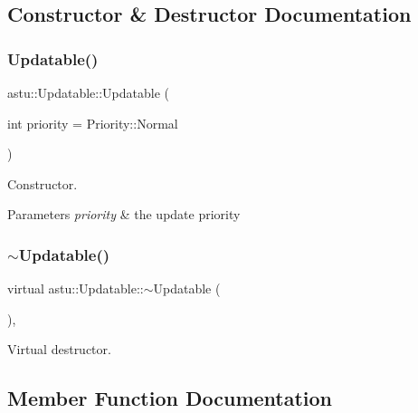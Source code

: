 \subsection{Constructor \& Destructor Documentation}
\mbox{\label{classastu_1_1Updatable_a5004b9bf883f7961762d0edc6b8329ba}} 
\subsubsection{\texorpdfstring{Updatable()}{Updatable()}}
{\footnotesize\ttfamily astu\+::\+Updatable\+::\+Updatable (\begin{DoxyParamCaption}\item[{int}]{priority = {\ttfamily Priority\+:\+:Normal} }\end{DoxyParamCaption})}

Constructor.


\begin{DoxyParams}{Parameters}
{\em priority} & the update priority \\
\hline
\end{DoxyParams}
\mbox{\label{classastu_1_1Updatable_a754466cfead86f94f366c32807eb118b}} 
\subsubsection{\texorpdfstring{$\sim$\+Updatable()}{~Updatable()}}
{\footnotesize\ttfamily virtual astu\+::\+Updatable\+::$\sim$\+Updatable (\begin{DoxyParamCaption}{ }\end{DoxyParamCaption})\hspace{0.3cm}{\ttfamily [inline]}, {\ttfamily [virtual]}}

Virtual destructor. 

\subsection{Member Function Documentation}
\mbox{\label{classastu_1_1Updatable_a925566c9770b95895c6c7294f9d51528}} 
